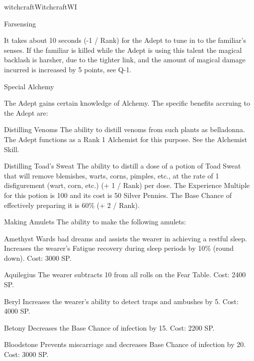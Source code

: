 \begin{College}[1.1]{witchcraft}{Witchcraft}{WI}
\begin{talent}[T-1]{Farsensing}
\begin{effects}
It takes about 10 seconds (-1 / Rank) for the Adept to tune in to the
familiar’s senses. If the familiar is killed while the Adept is using
this talent the magical backlash is harsher, due to the tighter link,
and the amount of magical damage incurred is increased by 5 points,
see Q-1.
\end{effects}
\end{talent}

\begin{talent}[T-2]{Special Alchemy}
\begin{effects}
The Adept gains certain knowledge of Alchemy.  The specific benefits
accruing to the Adept are:

\begin{Description}
\item[Distilling Venoms] The ability to distill venoms from such
  plants as belladonna.  The Adept functions as a Rank 1 Alchemist
  for this purpose.  See the Alchemist Skill.

\item[Distilling Toad’s Sweat] The ability to distill a dose of a
  potion of Toad Sweat that will remove blemishes, warts, corns,
  pimples, etc., at the rate of 1 disfigurement (wart, corn, etc.)  (+
  1 / Rank) per dose.  The Experience Multiple for this potion is 100
  and its cost is 50 Silver Pennies.  The Base Chance of effectively
  preparing it is 60\% (+ 2 / Rank).

\item[Making  Amulets]  The  ability  to  make  the  following amulets: 
\begin{Description}
\item[Amethyst] Wards bad dreams and assists the wearer in achieving a
  restful sleep.  Increases the wearer’s Fatigue recovery during sleep
  periods by 10\% (round down). Cost: 3000 SP.

\item[Aquilegius] The wearer subtracts 10 from all rolls on the Fear
  Table. Cost: 2400 SP.

\item[Beryl] Increases the wearer’s ability to detect traps and
  ambushes by 5. Cost: 4000 SP.

\item[Betony] Decreases the Base Chance of infection by 15. Cost: 2200
  SP.

\item[Bloodstone] Prevents miscarriage and decreases Base Chance of
  infection by 20. Cost: 3000 SP.


\end{Description}
\end{Description}
\end{effects}
\end{talent}
\end{College}
